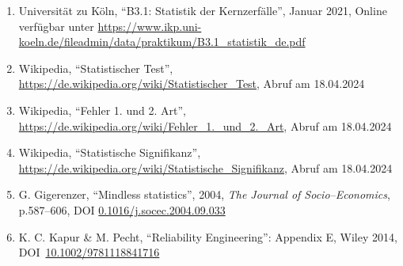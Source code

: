 \documentclass[12pt,a4paper]{scrartcl}
\numberwithin{equation}{section} %
\renewcommand{\[}{} %
\renewcommand{\]}{\noindent} %
\newcommand{\tightlist}{} %
\begin{document}
\begin{enumerate}
\def\labelenumi{\arabic{enumi}.}
\tightlist
\item
  Universität zu Köln, ``B3.1: Statistik der Kernzerfälle'', Januar
  2021, Online verfügbar unter
  \url{https://www.ikp.uni-koeln.de/fileadmin/data/praktikum/B3.1_statistik_de.pdf}
\item
  Wikipedia, ``Statistischer Test'',
  \url{https://de.wikipedia.org/wiki/Statistischer_Test}, Abruf am
  18.04.2024
\item
  Wikipedia, ``Fehler 1. und 2. Art'',
  \url{https://de.wikipedia.org/wiki/Fehler_1._und_2._Art}, Abruf am
  18.04.2024
\item
  Wikipedia, ``Statistische Signifikanz'',
  \url{https://de.wikipedia.org/wiki/Statistische_Signifikanz}, Abruf am
  18.04.2024
\item
  G. Gigerenzer, ``Mindless statistics'', 2004, \emph{The Journal of
  Socio--Economics}, p.587--606, DOI
  \href{https://doi.org/10.1016/j.socec.2004.09.033}{0.1016/j.socec.2004.09.033}
\item
  K. C. Kapur \& M. Pecht, ``Reliability Engineering'': Appendix E,
  Wiley 2014, DOI~\href{https://doi.org/10.1002/9781118841716}{10.1002/9781118841716}
\end{enumerate}
\end{document}
